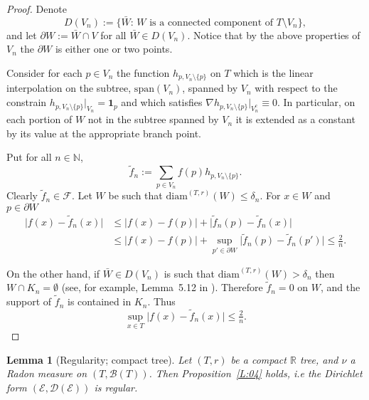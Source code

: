 \documentclass[11pt]{amsart}
\numberwithin{equation}{section}
\newtheorem{lemma}[definition]{Lemma}
\begin{document}
{\begin{proof}
Denote
\begin{equation}
\label{e:DV}
   D(V_n)
 :=
   \big\{\bar{W}:\,W\mbox{ is a connected component of }T\setminus V_n\big\},
\end{equation}
and let  $\partial{W}:=\bar{W}\cap V$ for all $\bar{W}\in D(V_n)$.
Notice that by the above properties of $V_{n}$ the $\partial{W}$ is either one or two points.

Consider for each $p\in V_n$ the function $h_{p,V_n\setminus\{p\}}$ on $T$ which is the linear interpolation on the subtree, $\mathrm{span}(V_n)$, spanned by $V_n$ with respect to the constrain $h_{p,V_n\setminus\{p\}}\big|_{V_n}=\mathbf{1}_p$ and which satisfies $\nabla h_{p,V_n\setminus\{p\}}\big|_{V^c_n}\equiv 0$. In particular, on each portion of $W$ not in the subtree spanned by $V_{n}$ it is extended as a constant by its value at the appropriate branch point.

Put for all $n\in\mathbb{N}$,
\begin{equation}
\label{e:tildef}
   \tilde{f}_n
 :=
   \sum_{p\in V_n}f(p){h}_{p,V_n\setminus\{p\}}.
\end{equation}
Clearly $\tilde{f}_{n} \in {\mathcal F}.$
Let  $W $ be such that $\mbox{diam}^{(T,r)}(W) \leq \delta_{n}.$
For $x\in W$ and $p \in \partial W$
\begin{equation}
\label{e:ftildef}
\begin{aligned}
   \big|f(x)-\tilde{f}_n(x)\big|
 &\le
   \big|f(x)-f(p)\big|+\big|\tilde{f}_n(p)-\tilde{f}_n(x)\big|
  \\
 &\le
   \big|f(x)-f(p)\big|+\sup_{p'\in\partial W}\big|\tilde{f}_n(p)-\tilde{f}_n(p')\big|\le
   \tfrac{2}{n}.
\end{aligned}
\end{equation}

On the other hand, if $\bar{W}\in D(V_n)$ is such that $\mbox{diam}^{(T,r)}(W) > \delta_{n}$ then ${W}\cap K_{n}=\emptyset$ (see, for example, Lemma~5.12 in \cite{Kigami95}). Therefore
$\tilde{f}_{n} = 0 $ on $W$, and the support of $\tilde{f}_{n}$ is contained in $K_{n}$. Thus
\begin{equation}
\label{e:030}
   \sup_{x \in T} \big|f(x)-\tilde{f}_n(x)\big| \leq \tfrac{2}{n}.
\end{equation}

\end{proof}{\smallskip}

{\begin{lemma}[Regularity; compact tree] Let $(T,r)$ be a compact ${{\mathbb R}}$ tree, and $\nu$ a Radon measure on $(T,{\mathcal B}(T))$. Then Proposition~\ref{L:04} holds, i.e the Dirichlet form $({\mathcal E},{\mathcal D}({\mathcal E}))$ is {{\it} regular}.
\end{lemma}{\smallskip}}

}
\end{document}
